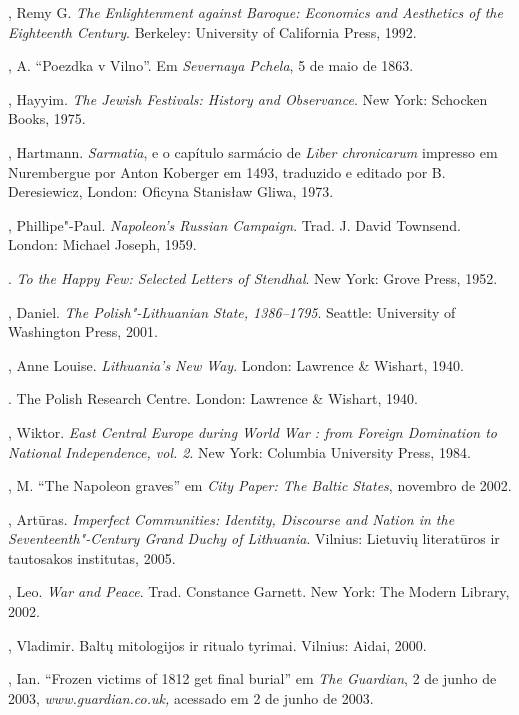 \begin{bibliohedra}
  , Remy G. \emph{The Enlightenment against Baroque: Economics
  and Aesthetics of the Eighteenth Century}. Berkeley: University of
  California Press, 1992.

  , A. ``Poezdka v Vilno''. Em \emph{Severnaya Pchela}, 5 de maio de
  1863.

  , Hayyim. \emph{The Jewish Festivals: History and Observance}.
  New York: Schocken Books, 1975.

  , Hartmann. \emph{Sarmatia}, e o capítulo sarmácio de
  \emph{Liber chronicarum} impresso em Nurembergue por Anton Koberger em
  1493, traduzido e editado por B. Deresiewicz, London: Oficyna
  Stanisław Gliwa, 1973.

  , Phillipe"-Paul. \emph{Napoleon's Russian Campaign}. Trad. J.
  David Townsend. London: Michael Joseph, 1959.

  . \emph{To the Happy Few: Selected Letters of Stendhal}. New
  York: Grove Press, 1952.

  , Daniel. \emph{The Polish"-Lithuanian State, 1386--1795}. Seattle:
  University of Washington Press, 2001.

  , Anne Louise. \emph{Lithuania's New Way}. London: Lawrence \&
  Wishart, 1940.

  . The Polish Research Centre. London:
  Lawrence \& Wishart, 1940.

  , Wiktor. \emph{East Central Europe during World War :
  from Foreign Domination to National Independence, vol. 2}. New York:
  Columbia University Press, 1984.

  , M. ``The Napoleon graves'' em \emph{City Paper: The Baltic
  States}, novembro de 2002.

  , Artūras. \emph{Imperfect Communities: Identity, Discourse
  and Nation in the Seventeenth"-Century Grand Duchy of Lithuania}.
  Vilnius: Lietuvių literatūros ir tautosakos institutas, 2005.

  , Leo. \emph{War and Peace}. Trad. Constance Garnett. New York:
  The Modern Library, 2002.

  , Vladimir. Baltų mitologijos ir ritualo tyrimai. Vilnius:
  Aidai, 2000.

  , Ian. ``Frozen victims of 1812 get final burial'' em \emph{The
  Guardian}, 2 de junho de 2003, \emph{www.guardian.co.uk,} acessado em
  2 de junho de 2003.


\end{bibliohedra}
